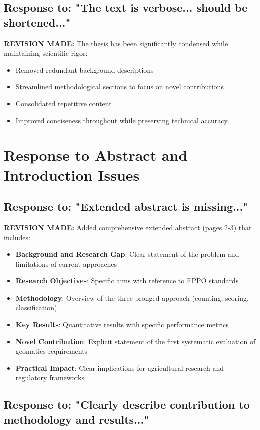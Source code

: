 \documentclass[11pt,a4paper]{article}
\begin{document}
\subsection{Response to: "The text is verbose... should be shortened..."}

\textbf{REVISION MADE:} The thesis has been significantly condensed while maintaining scientific rigor:
\begin{itemize}
\item Removed redundant background descriptions
\item Streamlined methodological sections to focus on novel contributions
\item Consolidated repetitive content
\item Improved conciseness throughout while preserving technical accuracy
\end{itemize}

\section{Response to Abstract and Introduction Issues}

\subsection{Response to: "Extended abstract is missing..."}

\textbf{REVISION MADE:} Added comprehensive extended abstract (pages 2-3) that includes:
\begin{itemize}
\item \textbf{Background and Research Gap}: Clear statement of the problem and limitations of current approaches
\item \textbf{Research Objectives}: Specific aims with reference to EPPO standards
\item \textbf{Methodology}: Overview of the three-pronged approach (counting, scoring, classification)
\item \textbf{Key Results}: Quantitative results with specific performance metrics
\item \textbf{Novel Contribution}: Explicit statement of the first systematic evaluation of geomatics requirements
\item \textbf{Practical Impact}: Clear implications for agricultural research and regulatory frameworks
\end{itemize}

\subsection{Response to: "Clearly describe contribution to methodology and results..."}
\end{document}
